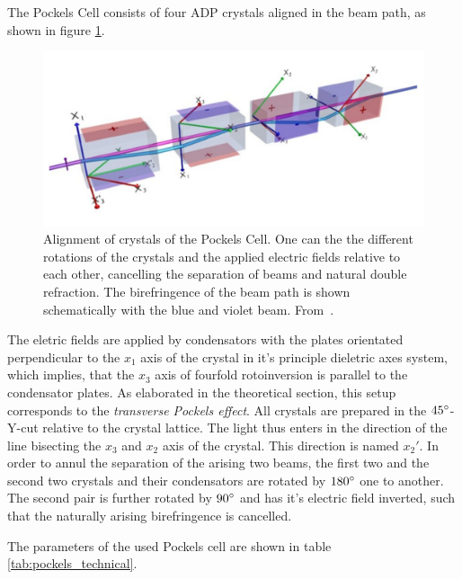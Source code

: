 The Pockels Cell consists of four ADP crystals aligned in the beam path, 
as shown in figure \ref{fig:pockels_cell_path}.

\begin{figure}
\includegraphics[width=\textwidth]{figures/pockels_cell_path.pdf}
\caption{
    Alignment of crystals of the Pockels Cell. One can the the different 
    rotations of the crystals and the applied electric fields 
    relative to each other, cancelling the separation of beams and 
    natural double refraction. The birefringence of 
    the beam path is shown schematically with the blue and violet beam. 
    From~\cite{versuchsanleitung}.
    }
\label{fig:pockels_cell_path}
\end{figure}

The eletric fields are applied by condensators with the plates 
orientated perpendicular to the $x_1$ axis of the crystal in 
it's principle dieletric axes system, which implies, that the 
$x_3$ axis of fourfold rotoinversion is parallel to the condensator 
plates. As elaborated in the theoretical section, this 
setup corresponds to the \emph{transverse Pockels effect}. 
All crystals are prepared in the $45^\circ$-Y-cut relative to the crystal 
lattice. The light thus enters in the direction of the line 
bisecting the $x_3$ and $x_2$ axis of the crystal. This direction 
is named $x_2'$. 
In order to annul the separation of the arising two beams, 
the first two and the second two crystals and their condensators 
are rotated by $180^\circ$ one to another. The second pair is 
further rotated by $90^\circ$ and has it's electric field inverted, 
such that the naturally arising birefringence is cancelled. 

The parameters of the used Pockels cell are shown in 
table \ref{tab:pockels_technical}.

